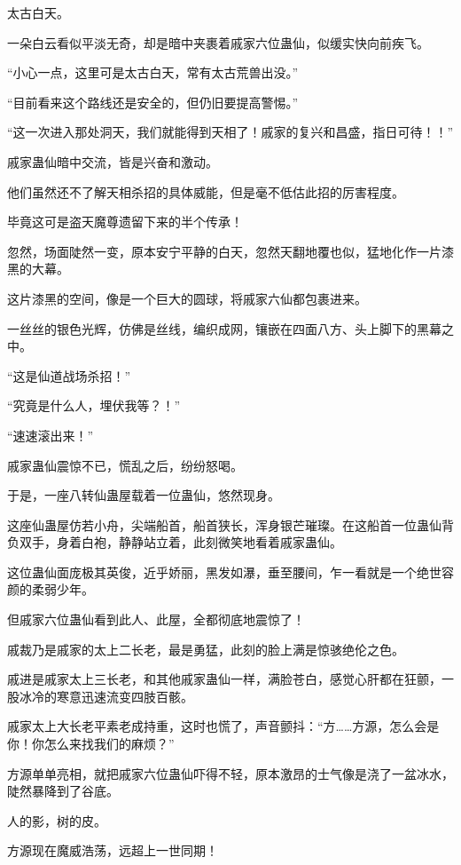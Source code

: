 
\begin{this_body}

太古白天。

一朵白云看似平淡无奇，却是暗中夹裹着戚家六位蛊仙，似缓实快向前疾飞。

“小心一点，这里可是太古白天，常有太古荒兽出没。”

“目前看来这个路线还是安全的，但仍旧要提高警惕。”

“这一次进入那处洞天，我们就能得到天相了！戚家的复兴和昌盛，指日可待！！”

戚家蛊仙暗中交流，皆是兴奋和激动。

他们虽然还不了解天相杀招的具体威能，但是毫不低估此招的厉害程度。

毕竟这可是盗天魔尊遗留下来的半个传承！

忽然，场面陡然一变，原本安宁平静的白天，忽然天翻地覆也似，猛地化作一片漆黑的大幕。

这片漆黑的空间，像是一个巨大的圆球，将戚家六仙都包裹进来。

一丝丝的银色光辉，仿佛是丝线，编织成网，镶嵌在四面八方、头上脚下的黑幕之中。

“这是仙道战场杀招！”

“究竟是什么人，埋伏我等？！”

“速速滚出来！”

戚家蛊仙震惊不已，慌乱之后，纷纷怒喝。

于是，一座八转仙蛊屋载着一位蛊仙，悠然现身。

这座仙蛊屋仿若小舟，尖端船首，船首狭长，浑身银芒璀璨。在这船首一位蛊仙背负双手，身着白袍，静静站立着，此刻微笑地看着戚家蛊仙。

这位蛊仙面庞极其英俊，近乎娇丽，黑发如瀑，垂至腰间，乍一看就是一个绝世容颜的柔弱少年。

但戚家六位蛊仙看到此人、此屋，全都彻底地震惊了！

戚裁乃是戚家的太上二长老，最是勇猛，此刻的脸上满是惊骇绝伦之色。

戚进是戚家太上三长老，和其他戚家蛊仙一样，满脸苍白，感觉心肝都在狂颤，一股冰冷的寒意迅速流变四肢百骸。

戚家太上大长老平素老成持重，这时也慌了，声音颤抖：“方……方源，怎么会是你！你怎么来找我们的麻烦？”

方源单单亮相，就把戚家六位蛊仙吓得不轻，原本激昂的士气像是浇了一盆冰水，陡然暴降到了谷底。

人的影，树的皮。

方源现在魔威浩荡，远超上一世同期！


\end{this_body}
